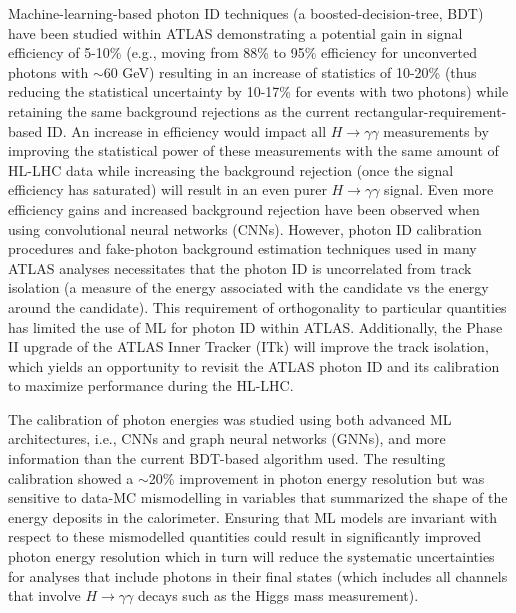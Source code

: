 \documentclass[letter, USenglish, 11pt, subfigure]{article}
\begin{document}
Machine-learning-based photon ID techniques (a boosted-decision-tree, BDT) have been studied within ATLAS demonstrating a potential gain in signal efficiency of 5-10\% (e.g., moving from 88\% to 95\% efficiency for unconverted photons with \pt$\sim$60 GeV) resulting in an increase of statistics of 10-20\% (thus reducing the statistical uncertainty by 10-17\% for events with two photons) while retaining the same background rejections as the current rectangular-requirement-based ID. An increase in efficiency would impact all $H\to\gamma\gamma$ measurements by improving the statistical power of these measurements with the same amount of HL-LHC data while increasing the background rejection (once the signal efficiency has saturated) will result in an even purer $H\to\gamma\gamma$ signal. Even more efficiency gains and increased background rejection have been observed when using convolutional neural networks (CNNs). However, photon ID calibration procedures and fake-photon background estimation techniques used in many ATLAS analyses necessitates that the photon ID is uncorrelated from track isolation (a measure of the energy associated with the candidate vs the energy around the candidate). This requirement of orthogonality to particular quantities has limited the use of ML for photon ID within ATLAS. Additionally, the Phase II upgrade of the ATLAS Inner Tracker (ITk) will improve the track isolation, which yields an opportunity to revisit the ATLAS photon ID and its calibration to maximize performance during the HL-LHC. 

The calibration of photon energies was studied using both advanced ML architectures, i.e., CNNs and graph neural networks (GNNs), and more information than the current BDT-based algorithm used. The resulting calibration showed a $\sim$20\% improvement in photon energy resolution but was sensitive to data-MC mismodelling in variables that summarized the shape of the energy deposits in the calorimeter. Ensuring that ML models are invariant with respect to these mismodelled quantities could result in significantly improved photon energy resolution which in turn will reduce the systematic uncertainties for analyses that include photons in their final states (which includes all channels that involve $H\to\gamma\gamma$ decays such as the Higgs mass measurement).
\end{document}

